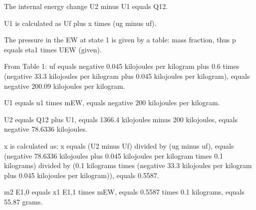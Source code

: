 The internal energy change U2 minus U1 equals Q12.

U1 is calculated as Uf plus x times (ug minus uf).

The pressure in the EW at state 1 is given by a table: mass fraction, thus p equals eta1 times UEW (given).

From Table 1:
uf equals negative 0.045 kilojoules per kilogram plus 0.6 times (negative 33.3 kilojoules per kilogram plus 0.045 kilojoules per kilogram), equals negative 200.09 kilojoules per kilogram.

U1 equals u1 times mEW, equals negative 200 kilojoules per kilogram.

U2 equals Q12 plus U1, equals 1366.4 kilojoules minus 200 kilojoules, equals negative 78.6336 kilojoules.

x is calculated as:
x equals (U2 minus Uf) divided by (ug minus uf), equals (negative 78.6336 kilojoules plus 0.045 kilojoules per kilogram times 0.1 kilograms) divided by (0.1 kilograms times (negative 33.3 kilojoules per kilogram plus 0.045 kilojoules per kilogram)), equals 0.5587.

m2 E1,0 equals x1 E1,1 times mEW, equals 0.5587 times 0.1 kilograms, equals 55.87 grams.